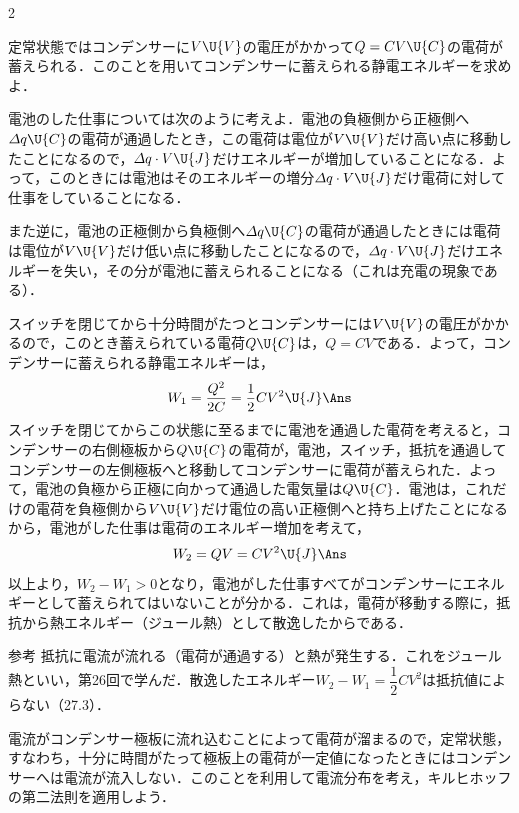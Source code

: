 \begin{multicols}{2}
\par\nopagebreak
\begin{sisin}
定常状態ではコンデンサーに$V\U{V}$の電圧がかかって$Q=CV\U{C}$の電荷が蓄えられる．このことを用いてコンデンサーに蓄えられる静電エネルギーを求めよ．

電池のした仕事については次のように考えよ．電池の負極側から正極側へ$\varDelta q\U{C}$の電荷が通過したとき，この電荷は電位が$V\U{V}$だけ高い点に移動したことになるので，$\varDelta q\cdot V\U{J}$だけエネルギーが増加していることになる．よって，このときには電池はそのエネルギーの増分$\varDelta q\cdot V\U{J}$だけ電荷に対して仕事をしていることになる．

また逆に，電池の正極側から負極側へ$\varDelta q\U{C}$の電荷が通過したときには電荷は電位が$V\U{V}$だけ低い点に移動したことになるので，$\varDelta q\cdot V\U{J}$だけエネルギーを失い，その分が電池に蓄えられることになる（これは充電の現象である）．
\end{sisin}
\KaiHead
\begin{komon}
 スイッチを閉じてから十分時間がたつとコンデンサーには$V\U{V}$の電圧がかかるので，このとき蓄えられている電荷$Q\U{C}$は，$Q=CV$である．よって，コンデンサーに蓄えられる静電エネルギーは，
       \[W_1=\frac{Q^2}{2C}=\frac{1}{2}CV^2\U{J}\Ans\]
 スイッチを閉じてからこの状態に至るまでに電池を通過した電荷を考えると，コンデンサーの右側極板から$Q\U{C}$の電荷が，電池，スイッチ，抵抗を通過してコンデンサーの左側極板へと移動してコンデンサーに電荷が蓄えられた．よって，電池の負極から正極に向かって通過した電気量は$Q\U{C}$．電池は，これだけの電荷を負極側から$V\U{V}$だけ電位の高い正極側へと持ち上げたことになるから，電池がした仕事は電荷のエネルギー増加を考えて，
       \[W_2=QV=CV^2\U{J}\Ans\]
 以上より，$W_2-W_1>0$となり，電池がした仕事すべてがコンデンサーにエネルギーとして蓄えられてはいないことが分かる．これは，{\gtfamily 電荷が移動する際に，抵抗から熱エネルギー（ジュール熱）として散逸したからである}．\Ans
\end{komon}
\begin{bsHosoku}{参考}
抵抗に電流が流れる（電荷が通過する）と熱が発生する．これをジュール熱といい，第26回で学んだ．散逸したエネルギー$W_2-W_1=\dfrac{1}{2}CV^2$は抵抗値によらない（27.3）．
\end{bsHosoku}

\par\nopagebreak
\begin{sisin}
電流がコンデンサー極板に流れ込むことによって電荷が溜まるので，定常状態，すなわち，十分に時間がたって極板上の電荷が一定値になったときにはコンデンサーへは電流が流入しない．このことを利用して電流分布を考え，キルヒホッフの第二法則を適用しよう．


\end{sisin}
\end{multicols}
